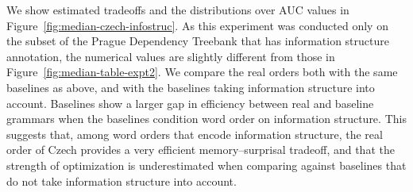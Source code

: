 We show estimated tradeoffs and the distributions over AUC values in Figure~\ref{fig:median-czech-infostruc}.
As this experiment was conducted only on the subset of the Prague Dependency Treebank that has information structure annotation, the numerical values are slightly different from those in Figure~\ref{fig:median-table-expt2}. We compare the real orders both with the same baselines as above, and with the baselines taking information structure into account.
Baselines show a larger gap in efficiency between real and baseline grammars when the baselines condition word order on information structure.
This suggests that, among word orders that encode information structure, the real order of Czech provides a very efficient memory--surprisal tradeoff, and that the strength of optimization is underestimated when comparing against baselines that do not take information structure into account.


